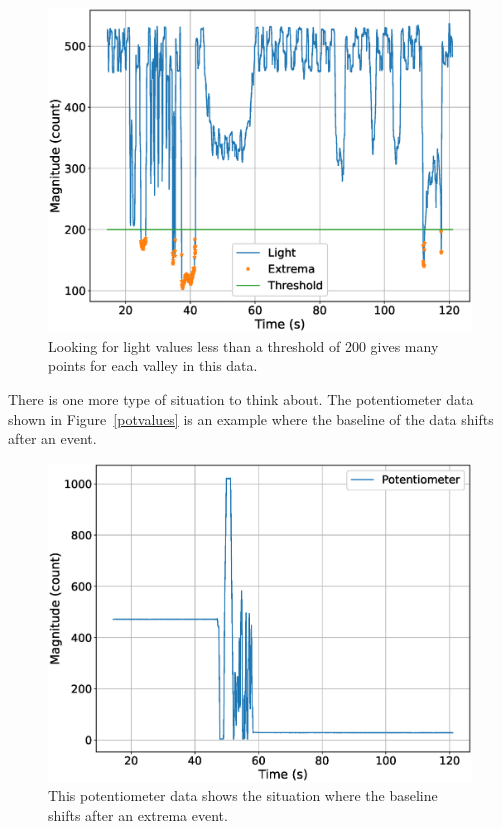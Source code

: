 \begin{figure}[!htb]
	\centering
	\includegraphics[scale=0.4]{information/light-thresh.eps}
	\caption{Looking for light values less than a threshold of 200 gives many points for each valley
    in this data.}
	\label{fig:lightthresh}
\end{figure}

There is one more type of situation to think about. The potentiometer data shown in 
Figure~\ref{potvalues} is an example where the baseline of the data shifts after an event.

\begin{figure}[!htb]
	\centering
	\includegraphics[scale=0.4]{information/pot.eps}
	\caption{This potentiometer data shows the situation where the baseline shifts after 
    an extrema event.}
	\label{fig:potvalues}
\end{figure}

